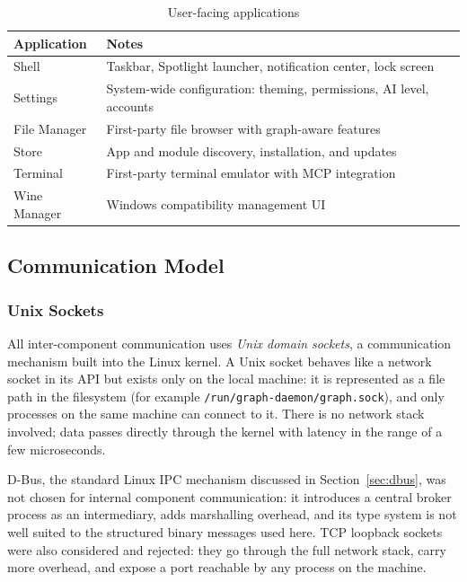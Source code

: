 \begin{table}[htbp]
\caption{User-facing applications}
\label{tab:apps}
\begin{tabularx}{\linewidth}{lX}
\toprule
\textbf{Application} & \textbf{Notes} \\
\midrule
Shell        & Taskbar, Spotlight launcher, notification center, lock screen \\
Settings     & System-wide configuration: theming, permissions, AI level, accounts \\
File Manager & First-party file browser with graph-aware features \\
Store        & App and module discovery, installation, and updates \\
Terminal     & First-party terminal emulator with MCP integration \\
Wine Manager & Windows compatibility management UI \\
\bottomrule
\end{tabularx}
\end{table}

\subsection{Communication Model}
\label{sec:communication}

\subsubsection{Unix Sockets}
\label{sec:unix-sockets}

All inter-component communication uses \emph{Unix domain sockets}, a
communication mechanism built into the Linux kernel. A Unix socket behaves
like a network socket in its API but exists only on the local machine: it is
represented as a file path in the filesystem (for example
\texttt{/run/graph-daemon/graph.sock}), and only processes on the same machine
can connect to it. There is no network stack involved; data passes directly
through the kernel with latency in the range of a few microseconds.

D-Bus, the standard Linux IPC mechanism discussed in
Section~\ref{sec:dbus}, was not chosen for internal component communication:
it introduces a central broker process as an intermediary, adds marshalling
overhead, and its type system is not well suited to the structured binary
messages used here. TCP loopback sockets were also considered and rejected: they
go through the full network stack, carry more overhead, and expose a port
reachable by any process on the machine.

